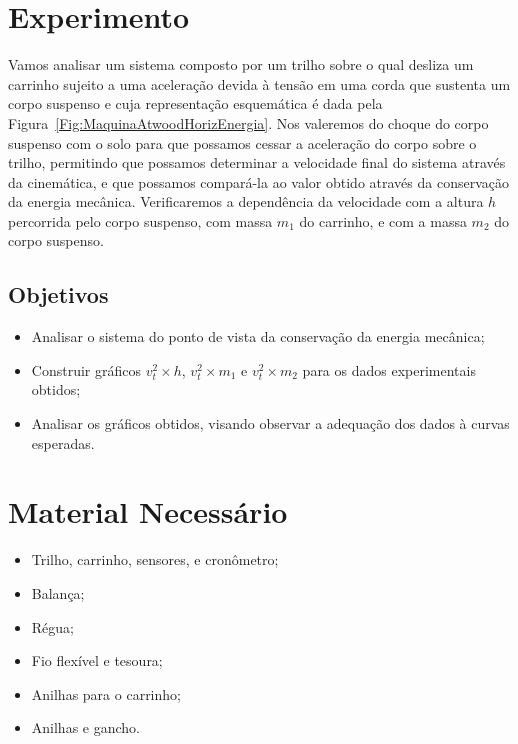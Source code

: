 \section{Experimento}

Vamos analisar um sistema composto por um trilho sobre o qual desliza um carrinho sujeito a uma aceleração devida à tensão em uma corda que sustenta um corpo suspenso e cuja representação esquemática é dada pela Figura~\ref{Fig:MaquinaAtwoodHorizEnergia}. Nos valeremos do choque do corpo suspenso com o solo para que possamos cessar a aceleração do corpo sobre o trilho, permitindo que possamos determinar a velocidade final do sistema através da cinemática, e que possamos compará-la ao valor obtido através da conservação da energia mecânica. Verificaremos a dependência da velocidade com a altura $h$ percorrida pelo corpo suspenso, com massa $m_1$ do carrinho, e com a massa $m_2$ do corpo suspenso.

\subsection{Objetivos}

\begin{itemize}
	\item Analisar o sistema do ponto de vista da conservação da energia mecânica;
	\item Construir gráficos $v_t^2 \times h$, $v_t^2 \times m_1$ e $v_t^2 \times m_2$ para os dados experimentais obtidos;
	\item Analisar os gráficos obtidos, visando observar a adequação dos dados à curvas esperadas.
\end{itemize}

\section{Material Necessário}

\begin{itemize}
	\item Trilho, carrinho, sensores, e cronômetro;
	\item Balança;
	\item Régua;
	\item Fio flexível e tesoura;
	\item Anilhas para o carrinho;
	\item Anilhas e gancho.
\end{itemize}


